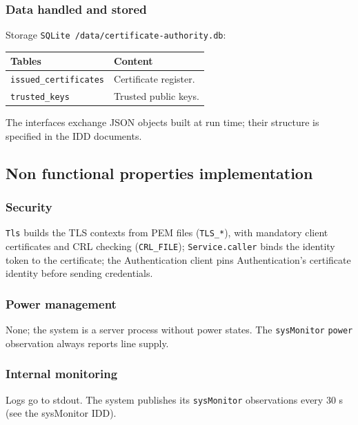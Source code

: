 \documentclass[a4paper]{arrowhead}
\begin{document}
\subsubsection{Data handled and stored}

Storage \texttt{SQLite /\allowbreak{}data/\allowbreak{}certificate-\allowbreak{}authority.\allowbreak{}db}:

\noindent\begin{longtable}{| p{6.4cm} | p{8.8cm} |} \hline
\rowcolor{gray!33} Tables & Content \\ \hline \endhead
\texttt{issued\_\allowbreak{}certificates} & Certificate register. \\ \hline
\texttt{trusted\_\allowbreak{}keys} & Trusted public keys. \\ \hline
\end{longtable}

The interfaces exchange JSON objects built at run time; their structure is specified in the IDD documents.

\subsection{Non functional properties implementation}

\subsubsection{Security}

\texttt{Tls} builds the TLS contexts from PEM files (\texttt{TLS\_\allowbreak{}*}), with mandatory client certificates and CRL checking (\texttt{CRL\_\allowbreak{}FILE}); \texttt{Service.\allowbreak{}caller} binds the identity token to the certificate; the Authentication client pins Authentication's certificate identity before sending credentials.

\subsubsection{Power management}

None; the system is a server process without power states. The \texttt{sysMonitor} \texttt{power} observation always reports line supply.

\subsubsection{Internal monitoring}

Logs go to stdout. The system publishes its \texttt{sysMonitor} observations every 30 s (see the sysMonitor IDD).
\end{document}
